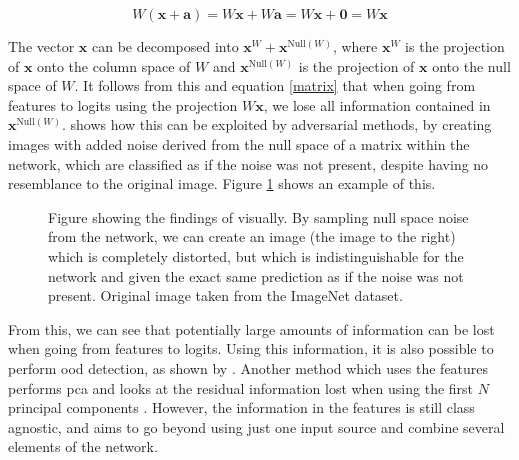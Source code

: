 \documentclass[UKenglish]{uiomasterthesis} %
\theoremstyle{definition}
\begin{document}
\begin{equation}
W (\bm{x} + \bm{a}) = W \bm{x} + W \bm{a} = W \bm{x} + \bm{0} = W \bm{x}
\label{matrix}
\end{equation}

The vector $\bm{x}$ can be decomposed into $\bm{x}^W + \bm{x}^{\text{Null}(W)}$, where $\bm{x}^W$ is the projection of $\bm{x}$ onto the column space of $W$ and $\bm{x}^{\text{Null}(W)}$ is the projection of $\bm{x}$ onto the null space of $W$. It follows from this and equation \ref{matrix} that when going from features to logits using the projection $W \bm{x}$, we lose all information contained in $\bm{x}^{\text{Null}(W)}$. \cite{nusa} shows how this can be exploited by adversarial methods, by creating images with added noise derived from the null space of a matrix within the network, which are classified as if the noise was not present, despite having no resemblance to the original image. Figure \ref{dog} shows an example of this.

\begin{figure}[H]
    \begin{center}

    \caption{Figure showing the findings of \cite{nusa} visually. By sampling null space noise from the network, we can create an image (the image to the right) which is completely distorted, but which is indistinguishable for the network and given the exact same prediction as if the noise was not present. Original image taken from the ImageNet dataset.}
    \label{dog}
    \end{center}
\end{figure}


From this, we can see that potentially large amounts of information can be lost when going from features to logits. Using this information, it is also possible to perform \ac{ood} detection, as shown by \cite{nusa}. Another method which uses the features performs \ac{pca} and looks at the residual information lost when using the first $N$ principal components \cite{subspace}. However, the information in the features is still class agnostic, and \cite{vim} aims to go beyond using just one input source and combine several elements of the network.
\end{document}
